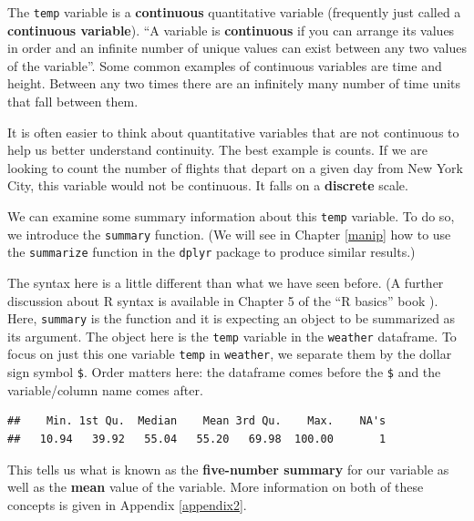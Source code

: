 \documentclass[]{tufte-book}
\newenvironment{Shaded}{\begin{snugshade}}{\end{snugshade}}
\newcommand{\KeywordTok}[1]{\textcolor[rgb]{0.13,0.29,0.53}{\textbf{{#1}}}}
\newcommand{\NormalTok}[1]{{#1}}
\begin{document}
The \texttt{temp} variable is a \textbf{continuous} quantitative
variable (frequently just called a \textbf{continuous variable}). ``A
variable is \textbf{continuous} if you can arrange its values in order
and an infinite number of unique values can exist between any two values
of the variable''\citep{rds2016}. Some common examples of continuous
variables are time and height. Between any two times there are an
infinitely many number of time units that fall between them.

It is often easier to think about quantitative variables that are not
continuous to help us better understand continuity. The best example is
counts. If we are looking to count the number of flights that depart on
a given day from New York City, this variable would not be continuous.
It falls on a \textbf{discrete} scale.

We can examine some summary information about this \texttt{temp}
variable. To do so, we introduce the \texttt{summary} function. (We will
see in Chapter \ref{manip} how to use the \texttt{summarize} function in
the \texttt{dplyr} package to produce similar results.)

The syntax here is a little different than what we have seen before. (A
further discussion about R syntax is available in Chapter 5 of the ``R
basics'' book \citep{usedtor2016}). Here, \texttt{summary} is the
function and it is expecting an object to be summarized as its argument.
The object here is the \texttt{temp} variable in the \texttt{weather}
dataframe. To focus on just this one variable \texttt{temp} in
\texttt{weather}, we separate them by the dollar sign symbol
\texttt{\$}. Order matters here: the dataframe comes before the
\texttt{\$} and the variable/column name comes after.

\begin{Shaded}
\end{Shaded}

\begin{verbatim}
##    Min. 1st Qu.  Median    Mean 3rd Qu.    Max.    NA's 
##   10.94   39.92   55.04   55.20   69.98  100.00       1
\end{verbatim}

This tells us what is known as the \textbf{five-number summary} for our
variable as well as the \textbf{mean} value of the variable. More
information on both of these concepts is given in Appendix
\ref{appendix2}.
\end{document}
